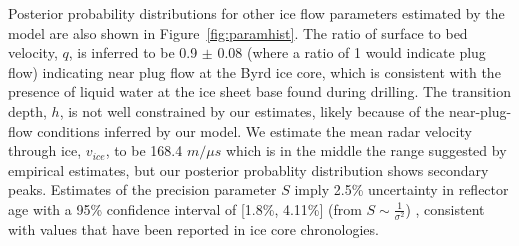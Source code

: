 Posterior probability distributions for other ice flow parameters estimated by the model are also shown in Figure~\ref{fig:paramhist}. The ratio of surface to bed velocity, $q$, is inferred to be 0.9 $\pm$ 0.08 (where a ratio of 1 would indicate plug flow) indicating near plug flow at the Byrd ice core, which is consistent with the presence of liquid water at the ice sheet base found during drilling. The transition depth, $h$, is not well constrained by our estimates, likely because of the near-plug-flow conditions inferred by our model.
We estimate the mean radar velocity through ice, $v_{ice}$, to be 168.4 $m/{\mu}s$ which is in the middle the range suggested by empirical estimates, but our posterior probablity distribution shows secondary peaks. Estimates of the precision parameter $S$ imply 2.5\% uncertainty in reflector age with a 95\% confidence interval of [1.8\%, 4.11\%] (from $S \sim \frac{1}{\sigma^2}$)%
, consistent with values that have been reported in ice core chronologies.









